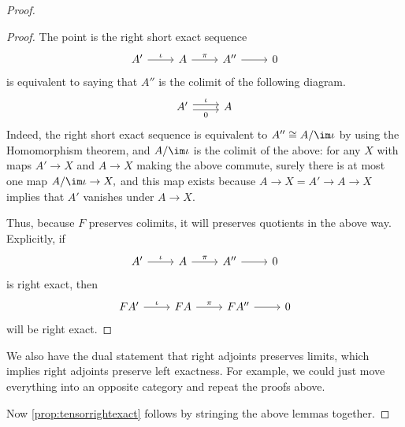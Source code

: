\begin{proof}
\begin{lemma}
	\end{lemma}
	\begin{proof}
		The point is the right short exact sequence
		\[\begin{tikzcd}
			{A'} & A & {A''} & 0
			\arrow["\iota", from=1-1, to=1-2]
			\arrow["\pi", from=1-2, to=1-3]
			\arrow[from=1-3, to=1-4]
		\end{tikzcd}\]
		is equivalent to saying that $A''$ is the colimit of the following diagram.
		\[\begin{tikzcd}
			{A'} & A
			\arrow["\iota", shift left=1, from=1-1, to=1-2]
			\arrow["0"', shift right=1, from=1-1, to=1-2]
		\end{tikzcd}\]
		Indeed, the right short exact sequence is equivalent to $A''\cong A/\im\iota$ by using the Homomorphism theorem, and $A/\im\iota$ is the colimit of the above: for any $X$ with maps $A'\to X$ and $A\to X$ making the above commute, surely there is at most one map $A/\im\iota\to X,$ and this map exists because $A\to X=A'\to A\to X$ implies that $A'$ vanishes under $A\to X.$

		Thus, because $F$ preserves colimits, it will preserves quotients in the above way. Explicitly, if
		\[\begin{tikzcd}
			{A'} & A & {A''} & 0
			\arrow["\iota", from=1-1, to=1-2]
			\arrow["\pi", from=1-2, to=1-3]
			\arrow[from=1-3, to=1-4]
		\end{tikzcd}\]
		is right exact, then
		\[\begin{tikzcd}
			{FA'} & FA & {FA''} & 0
			\arrow["\iota", from=1-1, to=1-2]
			\arrow["\pi", from=1-2, to=1-3]
			\arrow[from=1-3, to=1-4]
		\end{tikzcd}\]
		will be right exact.
	\end{proof}
	\begin{remark}
		We also have the dual statement that right adjoints preserves limits, which implies right adjoints preserve left exactness. For example, we could just move everything into an opposite category and repeat the proofs above.
	\end{remark}
	Now \autoref{prop:tensorrightexact} follows by stringing the above lemmas together.
\end{proof}
